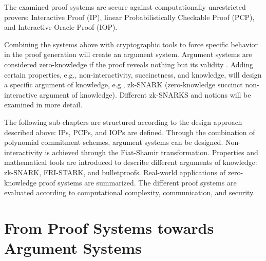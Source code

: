 The examined proof systems are secure against computationally unrestricted provers: Interactive Proof (IP), linear Probabilistically Checkable Proof (PCP), and Interactive Oracle Proof (IOP). 

Combining the systems above with cryptographic tools to force specific behavior in the proof generation will create an argument system. Argument systems are considered zero-knowledge if the proof reveals nothing but its validity \citep{GoldwasserIPs}. Adding certain properties, e.g., non-interactivity, succinctness, and knowledge, will design a specific argument of knowledge, e.g., zk-SNARK (zero-knowledge succinct non-interactive argument of knowledge). Different zk-SNARKS and notions will be examined in more detail.

The following sub-chapters are structured according to the design approach described above:
IPs, PCPs, and IOPs are defined. Through the combination of polynomial commitment schemes, argument systems can be designed. Non-interactivity is achieved through the Fiat-Shamir transformation.
Properties and mathematical tools are introduced to describe different arguments of knowledge: zk-SNARK, FRI-STARK, and bulletproofs.
Real-world applications of zero-knowledge proof systems are summarized.
The different proof systems are evaluated according to computational complexity, communication, and security.

\section{From Proof Systems towards Argument Systems}

